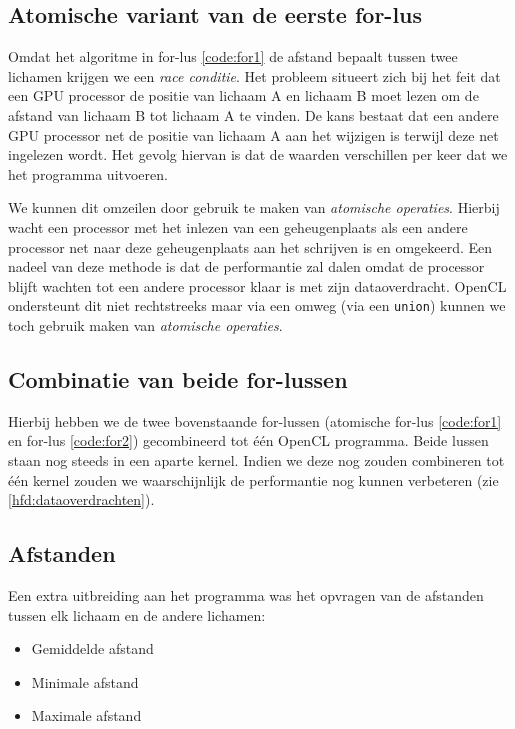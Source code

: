 \documentclass{article}
\begin{document}
\subsection{Atomische variant van de eerste for-lus}
\label{hfd:atomisch-for1}
Omdat het algoritme in for-lus \ref{code:for1} de afstand bepaalt
tussen twee lichamen krijgen we een \textit{race conditie}. Het probleem situeert
zich bij het feit dat een GPU processor de positie van lichaam A en lichaam B moet
lezen om de afstand van lichaam B tot lichaam A te vinden. De kans bestaat dat een
andere GPU processor net de positie van lichaam A aan het wijzigen is terwijl deze
net ingelezen wordt. Het gevolg hiervan is dat de waarden verschillen per keer dat
we het programma uitvoeren.

We kunnen dit omzeilen door gebruik te maken van \textit{atomische operaties}.
Hierbij wacht een processor met het inlezen van een geheugenplaats als een andere
processor net naar deze geheugenplaats aan het schrijven is en omgekeerd. Een
nadeel van deze methode is dat de performantie zal dalen omdat de processor blijft
wachten tot een andere processor klaar is met zijn dataoverdracht. OpenCL ondersteunt
dit niet rechtstreeks maar via een omweg (via een \texttt{union}) kunnen we toch
gebruik maken van \textit{atomische operaties}.

\subsection{Combinatie van beide for-lussen}
\label{hfd:combinatie-lussen}
Hierbij hebben we de twee bovenstaande for-lussen (atomische for-lus \ref{code:for1} en for-lus \ref{code:for2}) gecombineerd tot \'{e}\'{e}n
OpenCL programma. Beide lussen staan nog steeds in een aparte kernel. Indien we
deze nog zouden combineren tot \'{e}\'{e}n kernel zouden we waarschijnlijk de
performantie nog kunnen verbeteren (zie \ref{hfd:dataoverdrachten}).

\subsection{Afstanden}
Een extra uitbreiding aan het programma was het opvragen van de afstanden tussen
elk lichaam en de andere lichamen:

\begin{itemize}
    \item Gemiddelde afstand
    \item Minimale afstand
    \item Maximale afstand
\end{itemize}
\end{document}
